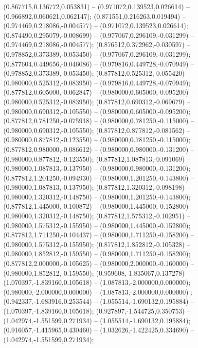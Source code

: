  (0.867715,0.136772,0.053831) -- (0.971072,0.139523,0.026614) -- (0.966892,0.060621,0.062147);
 (0.871551,0.216263,0.019494) -- (0.974469,0.218086,-0.004577) -- (0.971072,0.139523,0.026614);
 (0.874490,0.295079,-0.008699) -- (0.977067,0.296109,-0.031299) -- (0.974469,0.218086,-0.004577);
 (0.876512,0.372962,-0.030597) -- (0.978852,0.373389,-0.053450) -- (0.977067,0.296109,-0.031299);
 (0.877604,0.449656,-0.046086) -- (0.979816,0.449728,-0.070949) -- (0.978852,0.373389,-0.053450);
 (0.877812,0.525312,-0.055420) -- (0.980000,0.525312,-0.083950) -- (0.979816,0.449728,-0.070949);
 (0.877812,0.605000,-0.062847) -- (0.980000,0.605000,-0.095200) -- (0.980000,0.525312,-0.083950);
 (0.877812,0.690312,-0.069679) -- (0.980000,0.690312,-0.105550) -- (0.980000,0.605000,-0.095200);
 (0.877812,0.781250,-0.075918) -- (0.980000,0.781250,-0.115000) -- (0.980000,0.690312,-0.105550);
 (0.877812,0.877812,-0.081562) -- (0.980000,0.877812,-0.123550) -- (0.980000,0.781250,-0.115000);
 (0.877812,0.980000,-0.086612) -- (0.980000,0.980000,-0.131200) -- (0.980000,0.877812,-0.123550);
 (0.877812,1.087813,-0.091069) -- (0.980000,1.087813,-0.137950) -- (0.980000,0.980000,-0.131200);
 (0.877812,1.201250,-0.094930) -- (0.980000,1.201250,-0.143800) -- (0.980000,1.087813,-0.137950);
 (0.877812,1.320312,-0.098198) -- (0.980000,1.320312,-0.148750) -- (0.980000,1.201250,-0.143800);
 (0.877812,1.445000,-0.100872) -- (0.980000,1.445000,-0.152800) -- (0.980000,1.320312,-0.148750);
 (0.877812,1.575312,-0.102951) -- (0.980000,1.575312,-0.155950) -- (0.980000,1.445000,-0.152800);
 (0.877812,1.711250,-0.104437) -- (0.980000,1.711250,-0.158200) -- (0.980000,1.575312,-0.155950);
 (0.877812,1.852812,-0.105328) -- (0.980000,1.852812,-0.159550) -- (0.980000,1.711250,-0.158200);
 (0.877812,2.000000,-0.105625) -- (0.980000,2.000000,-0.160000) -- (0.980000,1.852812,-0.159550);
 (0.959608,-1.835067,0.137278) -- (1.070397,-1.839160,0.105618) -- (1.087813,-2.000000,0.000000);
 (0.980000,-2.000000,0.000000) -- (1.087813,-2.000000,0.000000) ;
 (0.942337,-1.683916,0.253544) -- (1.055514,-1.690132,0.195884) -- (1.070397,-1.839160,0.105618);
 (0.927897,-1.544725,0.350753) -- (1.042974,-1.551599,0.271934) -- (1.055514,-1.690132,0.195884);
 (0.916057,-1.415965,0.430460) -- (1.032626,-1.422425,0.334690) -- (1.042974,-1.551599,0.271934);
